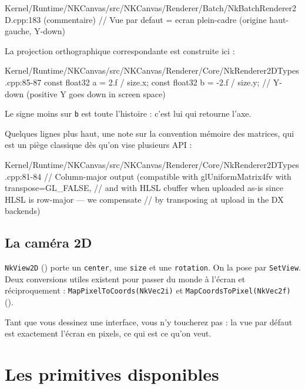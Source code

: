 \begin{nkcode}{Kernel/Runtime/NKCanvas/src/NKCanvas/Renderer/Batch/NkBatchRenderer2D.cpp:183 (commentaire)}
// Vue par defaut = ecran plein-cadre (origine haut-gauche, Y-down)
\end{nkcode}

La projection orthographique correspondante est construite ici :

\begin{nkcode}{Kernel/Runtime/NKCanvas/src/NKCanvas/Renderer/Core/NkRenderer2DTypes.cpp:85-87}
  const float32 a =  2.f / size.x;
  const float32 b = -2.f / size.y; // Y-down (positive Y goes down in screen space)
\end{nkcode}

\noindent Le signe moins sur \texttt{b} est toute l'histoire : c'est lui qui
retourne l'axe.

Quelques lignes plus haut, une note sur la convention mémoire des matrices, qui
est un piège classique dès qu'on vise plusieurs API :

\begin{nkcode}{Kernel/Runtime/NKCanvas/src/NKCanvas/Renderer/Core/NkRenderer2DTypes.cpp:81-84}
// Column-major output (compatible with glUniformMatrix4fv with transpose=GL_FALSE,
// and with HLSL cbuffer when uploaded as-is since HLSL is row-major — we compensate
// by transposing at upload in the DX backends)
\end{nkcode}

\subsection{La caméra 2D}

\texttt{NkView2D} () porte un
\texttt{center}, une \texttt{size} et une \texttt{rotation}. On la pose par
\texttt{SetView}. Deux conversions utiles existent pour passer du monde à
l'écran et réciproquement : \texttt{MapPixelToCoords(NkVec2i)} et
\texttt{MapCoordsToPixel(NkVec2f)}
().

Tant que vous dessinez une interface, vous n'y toucherez pas : la vue par défaut
est exactement l'écran en pixels, ce qui est ce qu'on veut.

\section{Les primitives disponibles}

